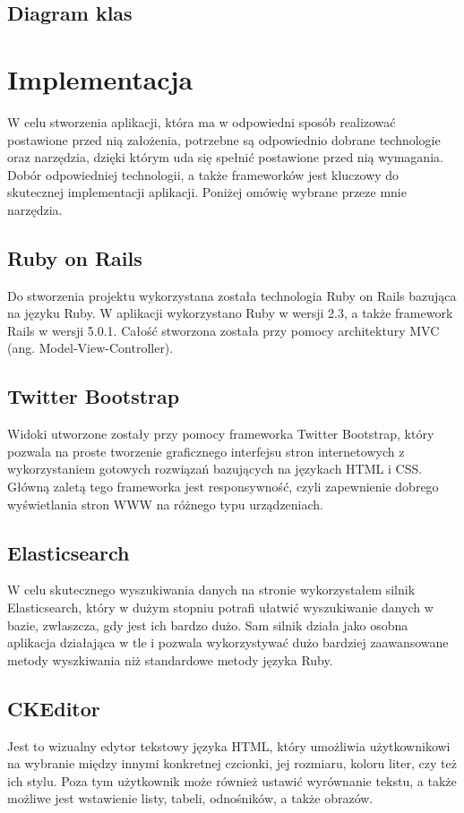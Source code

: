 \documentclass[brudnopis]{xmgr}
\begin{document}
\section{Diagram klas}

\chapter{Implementacja}
W celu stworzenia aplikacji, która ma w odpowiedni sposób realizować postawione przed nią
założenia, potrzebne są odpowiednio dobrane technologie oraz narzędzia, dzięki którym uda się 
spełnić postawione przed nią wymagania. Dobór odpowiedniej technologii, a także frameworków 
jest kluczowy do skutecznej implementacji aplikacji. Poniżej omówię wybrane przeze mnie narzędzia.

\section{Ruby on Rails}
Do stworzenia projektu wykorzystana została technologia Ruby on Rails bazująca na języku Ruby.
W aplikacji wykorzystano Ruby w wersji 2.3, a także framework Rails w wersji 5.0.1. Całość stworzona
została przy pomocy architektury MVC (ang. Model-View-Controller).

\section{Twitter Bootstrap}
Widoki utworzone zostały przy pomocy frameworka Twitter Bootstrap, który pozwala na proste tworzenie
graficznego interfejsu stron internetowych z wykorzystaniem gotowych rozwiązań bazujących na językach
HTML i CSS. Główną zaletą tego frameworka jest responsywność, czyli zapewnienie dobrego wyświetlania
stron WWW na różnego typu urządzeniach. 

\section{Elasticsearch}
W celu skutecznego wyszukiwania danych na stronie wykorzystałem silnik Elasticsearch, który w dużym stopniu
potrafi ułatwić wyszukiwanie danych w bazie, zwłaszcza, gdy jest ich bardzo dużo. Sam silnik działa jako osobna 
aplikacja działająca w tle i pozwala wykorzystywać dużo bardziej zaawansowane metody wyszkiwania niż standardowe
metody języka Ruby.

\section{CKEditor}
Jest to wizualny edytor tekstowy języka HTML, który umożliwia użytkownikowi na wybranie między innymi konkretnej 
czcionki, jej rozmiaru, koloru liter, czy też ich stylu. Poza tym użytkownik może również ustawić wyrównanie tekstu,
a także możliwe jest wstawienie listy, tabeli, odnośników, a także obrazów.
\end{document}
